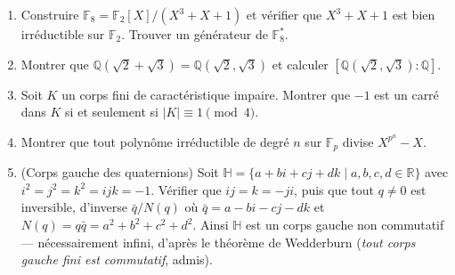 \begin{mdframed}[style=exobar]
  \begin{enumerate}
    \item Construire $\mathbb{F}_8 = \mathbb{F}_2[X]/(X^3+X+1)$ et
          vérifier que $X^3+X+1$ est bien irréductible sur $\mathbb{F}_2$.
          Trouver un générateur de $\mathbb{F}_8^*$.

    \item Montrer que $\mathbb{Q}(\sqrt{2}+\sqrt{3}) = \mathbb{Q}(\sqrt{2},\sqrt{3})$
          et calculer $[\mathbb{Q}(\sqrt{2},\sqrt{3}):\mathbb{Q}]$.

    \item Soit $K$ un corps fini de caractéristique impaire. Montrer que $-1$
          est un carré dans $K$ si et seulement si $|K| \equiv 1 \pmod{4}$.

    \item Montrer que tout polynôme irréductible de degré $n$ sur $\mathbb{F}_p$
          divise $X^{p^n} - X$.

    \item (Corps gauche des quaternions) Soit
          $\mathbb{H} = \{a + bi + cj + dk \mid a,b,c,d \in \mathbb{R}\}$
          avec $i^2 = j^2 = k^2 = ijk = -1$. Vérifier que $ij = k = -ji$, puis
          que tout $q \neq 0$ est inversible, d'inverse $\bar q/N(q)$ où
          $\bar q = a - bi - cj - dk$ et $N(q) = q\bar q = a^2+b^2+c^2+d^2$.
          Ainsi $\mathbb{H}$ est un corps gauche non commutatif — nécessairement
          infini, d'après le théorème de Wedderburn (\emph{tout corps gauche
          fini est commutatif}, admis).
  \end{enumerate}
\end{mdframed}


